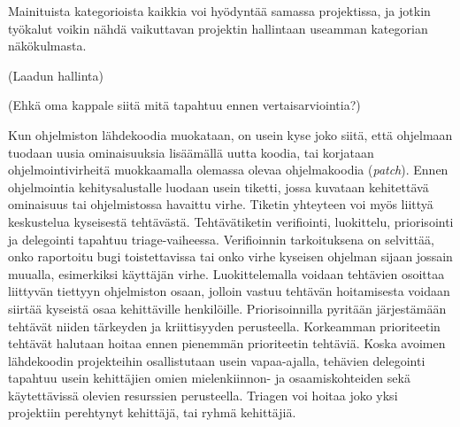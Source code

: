 \documentclass[utf8]{gradu3}
\begin{document}
Mainituista kategorioista kaikkia voi hyödyntää samassa projektissa, ja jotkin
työkalut voikin nähdä vaikuttavan projektin hallintaan useamman kategorian
näkökulmasta.



(Laadun hallinta)

(Ehkä oma kappale siitä mitä tapahtuu ennen vertaisarviointia?)

Kun ohjelmiston lähdekoodia muokataan, on usein kyse joko siitä, että ohjelmaan
tuodaan uusia ominaisuuksia lisäämällä uutta koodia, tai korjataan
ohjelmointivirheitä muokkaamalla olemassa olevaa ohjelmakoodia (\textit{patch}).
Ennen ohjelmointia kehitysalustalle luodaan usein tiketti, jossa kuvataan
kehitettävä ominaisuus tai ohjelmistossa havaittu virhe. Tiketin yhteyteen voi
myös liittyä keskustelua kyseisestä tehtävästä.%
Tehtävätiketin verifiointi, luokittelu, priorisointi ja delegointi tapahtuu
triage-vaiheessa.%
Verifioinnin tarkoituksena on selvittää, onko raportoitu bugi toistettavissa tai
onko virhe kyseisen ohjelman sijaan jossain muualla, esimerkiksi käyttäjän
virhe.%
Luokittelemalla voidaan tehtävien osoittaa liittyvän tiettyyn ohjelmiston osaan,
jolloin vastuu tehtävän hoitamisesta voidaan siirtää kyseistä osaa kehittäville
henkilöille.%
Priorisoinnilla pyritään järjestämään tehtävät niiden tärkeyden ja kriittisyyden
perusteella. Korkeamman prioriteetin tehtävät halutaan hoitaa ennen pienemmän
prioriteetin tehtäviä.%
Koska avoimen lähdekoodin projekteihin osallistutaan usein
vapaa-ajalla, tehävien delegointi tapahtuu usein kehittäjien omien
mielenkiinnon- ja osaamiskohteiden sekä käytettävissä olevien resurssien
perusteella.%
Triagen voi hoitaa joko yksi projektiin perehtynyt kehittäjä, tai ryhmä
kehittäjiä. 
\end{document}
